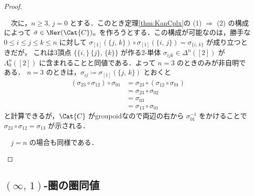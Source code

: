 \documentclass[TQFT_main]{subfiles}
\begin{document}
\begin{proof}
\begin{description}
        　次に，$n \ge 3,\, j=0$ とする．このとき定理\ref{thm:KanCplx}の (1) $\Longrightarrow$ (2) の構成によって $\bar{\sigma} \in \Ner (\Cat{C})_n$ を作ろうとする．この構成が可能なのは，勝手な $0 \le i \le j \le k \le n$ に対して $\sigma_{[1]} (\{j,\, k\}) \circ \sigma_{[1]} (\{i,\, j\}) = \sigma_{\{i,\, k\}}$ が成り立つときだが，
        これは3頂点 $\bigl\{\{i,\}\, \{j\},\, \{k\}\bigr\}$ が作る2-単体 $\sigma_{ijk} \in \Delta^n([2])$ が $\Lambda^n_0([2])$ に含まれることと同値である．よって $n=3$ のときのみが非自明である．
        $n=3$ のときは，$\sigma_{ij} \coloneqq \sigma_{[1]} (\{j,\, k\})$ とおくと
        \begin{align}
            (\sigma_{23} \circ \sigma_{12}) \circ \sigma_{01}
            &= \sigma_{23} \circ (\sigma_{12} \circ \sigma_{01}) \\
            &= \sigma_{23} \circ \sigma_{02} \\
            &= \sigma_{03} \\
            &= \sigma_{13} \circ \sigma_{01}
        \end{align}
        と計算できるが，$\Cat{C}$ がgroupoidなので両辺の右から $\sigma_{01}^{-1}$ をかけることで $\sigma_{23} \circ \sigma_{12} = \sigma_{13}$ が示される．

        　$j=n$ の場合も同様である．
    \end{description}
    
\end{proof}

\subsection{$(\infty,\, 1)$-圏の圏同値}
\end{document}
